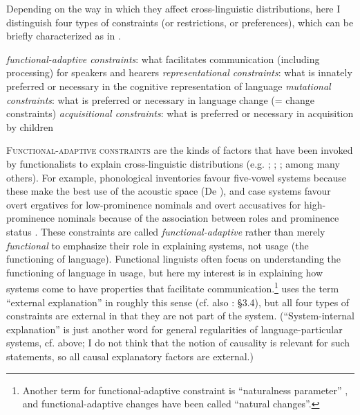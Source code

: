 \documentclass[output=paper]{langsci/langscibook}
\begin{document}
Depending on the way in which they affect cross-linguistic distributions, here I distinguish four types of constraints (or restrictions, or preferences), which can be briefly characterized as in .

\ea\label{ex:haspelmath:2} 
  \ea \textit{functional-adaptive constraints}: what facilitates communication (including processing) for speakers and hearers
  \ex   \textit{representational constraints}: what is innately preferred or necessary in the cognitive representation of language
  \ex   \textit{mutational constraints}: what is preferred or necessary in language change (= change constraints)
  \ex   \textit{acquisitional constraints}:  what is preferred or necessary in acquisition by children
  \z
\z

\textsc{Functional-adaptive constraints} are the kinds of factors that have been invoked by functionalists to explain cross-linguistic distributions (e.g. \citealt{Tomlin1986}; \citealt{Malchukov2008}; \citealt{Hawkins2014}; among many others). For example, phonological inventories favour five-vowel systems because these make the best use of the acoustic space (De \citealt{Boer2001}), and case systems favour overt ergatives for low-prominence nominals and overt accusatives for high-prominence nominals because of the association between roles and prominence status \citep{Dixon1994}. These constraints are called \textit{functional-adaptive} rather than merely \textit{functional} to emphasize their role in explaining systems, not usage (the functioning of language). Functional linguists often focus on understanding the functioning of language in usage, but here my interest is in explaining how systems come to have properties that facilitate communication.\footnote{Another term for functional-adaptive constraint is “naturalness parameter” \citep{DresslerEtAl1987}, and functional-adaptive changes have been called “natural changes”.} \citet{Good2008} uses the term “external explanation” in roughly this sense (cf. also \citealt{Newmeyer1998}: §3.4), but all four types of constraints are external in that they are not part of the system. (“System-internal explanation” is just another word for general regularities of language-particular systems, cf.  above; I do not think that the notion of causality is relevant for such statements, so all causal explanatory factors are external.)
\end{document}
